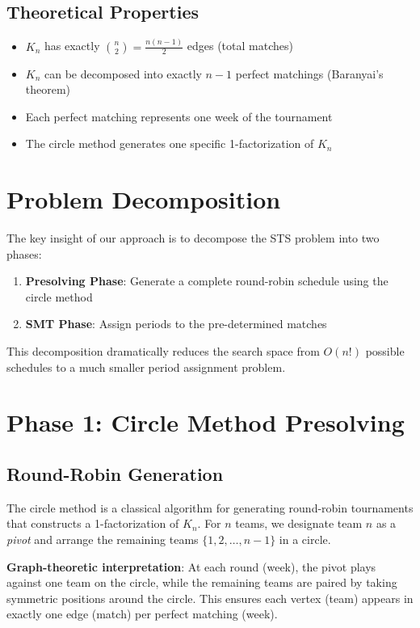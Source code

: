 \documentclass{article}
\begin{document}
\subsection{Theoretical Properties}
\begin{itemize}
    \item $K_n$ has exactly $\binom{n}{2} = \frac{n(n-1)}{2}$ edges (total matches)
    \item $K_n$ can be decomposed into exactly $n-1$ perfect matchings (Baranyai's theorem)
    \item Each perfect matching represents one week of the tournament
    \item The circle method generates one specific 1-factorization of $K_n$
\end{itemize}

\section{Problem Decomposition}

The key insight of our approach is to decompose the STS problem into two phases:

\begin{enumerate}
    \item \textbf{Presolving Phase}: Generate a complete round-robin schedule using the circle method
    \item \textbf{SMT Phase}: Assign periods to the pre-determined matches
\end{enumerate}

This decomposition dramatically reduces the search space from $O(n!)$ possible schedules to a much smaller period assignment problem.

\section{Phase 1: Circle Method Presolving}

\subsection{Round-Robin Generation}

The circle method is a classical algorithm for generating round-robin tournaments that constructs a 1-factorization of $K_n$. For $n$ teams, we designate team $n$ as a \textit{pivot} and arrange the remaining teams $\{1, 2, \ldots, n-1\}$ in a circle.

\textbf{Graph-theoretic interpretation}: At each round (week), the pivot plays against one team on the circle, while the remaining teams are paired by taking symmetric positions around the circle. This ensures each vertex (team) appears in exactly one edge (match) per perfect matching (week).
\end{document}
